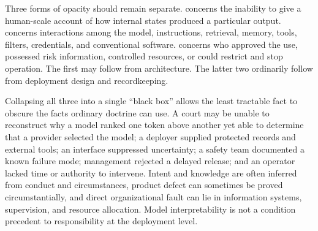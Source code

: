 Three forms of opacity should remain separate.  concerns the inability to give a human-scale account of how internal states produced a particular output.  concerns interactions among the model, instructions, retrieval, memory, tools, filters, credentials, and conventional software.  concerns who approved the use, possessed risk information, controlled resources, or could restrict and stop operation. The first may follow from architecture. The latter two ordinarily follow from deployment design and recordkeeping.

Collapsing all three into a single ``black box'' allows the least tractable fact to obscure the facts ordinary doctrine can use. A court may be unable to reconstruct why a model ranked one token above another yet able to determine that a provider selected the model; a deployer supplied protected records and external tools; an interface suppressed uncertainty; a safety team documented a known failure mode; management rejected a delayed release; and an operator lacked time or authority to intervene. Intent and knowledge are often inferred from conduct and circumstances, product defect can sometimes be proved circumstantially, and direct organizational fault can lie in information systems, supervision, and resource allocation. Model interpretability is not a condition precedent to responsibility at the deployment level.  %


